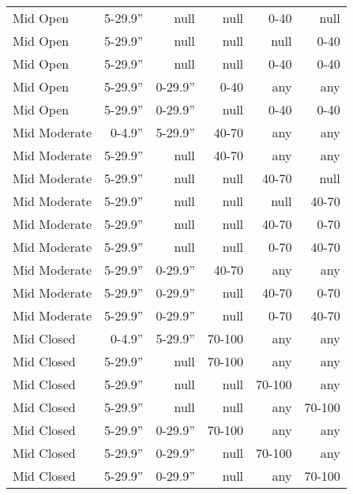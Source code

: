 \begin{table}[]
\begin{tabular}{@{}lrrrrr@{}}
Mid Open         & 5-29.9''        & null    & null   & 0-40   & null   \\
Mid Open         & 5-29.9''        & null    & null   & null   & 0-40   \\
Mid Open         & 5-29.9''        & null    & null   & 0-40   & 0-40   \\
Mid Open         & 5-29.9''        & 0-29.9'' & 0-40   & any    & any    \\
Mid Open         & 5-29.9''        & 0-29.9'' & null   & 0-40   & 0-40   \\
Mid Moderate     & 0-4.9''         & 5-29.9'' & 40-70  & any    & any    \\
Mid Moderate     & 5-29.9''        & null    & 40-70  & any    & any    \\
Mid Moderate     & 5-29.9''        & null    & null   & 40-70  & null   \\
Mid Moderate     & 5-29.9''        & null    & null   & null   & 40-70  \\
Mid Moderate     & 5-29.9''        & null    & null   & 40-70  & 0-70   \\
Mid Moderate     & 5-29.9''        & null    & null   & 0-70   & 40-70  \\
Mid Moderate     & 5-29.9''        & 0-29.9'' & 40-70  & any    & any    \\
Mid Moderate     & 5-29.9''        & 0-29.9'' & null   & 40-70  & 0-70   \\
Mid Moderate     & 5-29.9''        & 0-29.9'' & null   & 0-70   & 40-70  \\
Mid Closed       & 0-4.9''         & 5-29.9'' & 70-100 & any    & any    \\
Mid Closed       & 5-29.9''        & null    & 70-100 & any    & any    \\
Mid Closed       & 5-29.9''        & null    & null   & 70-100 & any    \\
Mid Closed       & 5-29.9''        & null    & null   & any    & 70-100 \\
Mid Closed       & 5-29.9''        & 0-29.9'' & 70-100 & any    & any    \\
Mid Closed       & 5-29.9''        & 0-29.9'' & null   & 70-100 & any    \\
Mid Closed       & 5-29.9''        & 0-29.9'' & null   & any    & 70-100 \\ \bottomrule
\end{tabular}
\end{table}

